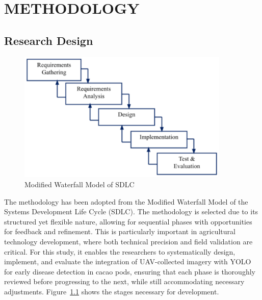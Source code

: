 \chapter{METHODOLOGY}

\section{Research Design}
\begin{figure}[H]
	\centering
	\caption{Modified Waterfall Model of SDLC}
	\label{fig:waterfall}
	\includegraphics[width=0.9\textwidth]{figures/Waterfall.pdf}
\end{figure}



The methodology has been adopted from the Modified Waterfall Model of the Systems Development Life Cycle (SDLC). The methodology is selected due to its structured yet flexible nature, allowing for sequential phases with opportunities for feedback and refinement. This is particularly important in agricultural technology development, where both technical precision and field validation are critical. For this study, it enables the researchers to systematically design, implement, and evaluate the integration of UAV-collected imagery with YOLO for early disease detection in cacao pods, ensuring that each phase is thoroughly reviewed before progressing to the next, while still accommodating necessary adjustments. Figure~\ref{fig:waterfall}  shows the stages necessary for development.

